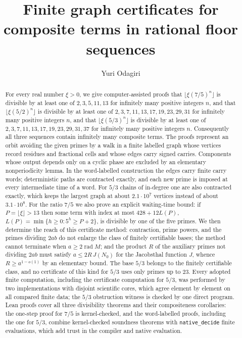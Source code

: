 \documentclass[11pt,reqno]{amsart}
\title[Finite graph certificates]{Finite graph certificates for composite terms in rational floor sequences}
\author{Yuri Odagiri}
\date{}
\theoremstyle{definition}
\theoremstyle{remark}
\begin{document}

\begin{abstract}

For every real number \(\xi>0\), we give computer-assisted proofs that
\(\lfloor\xi(7/5)^n\rfloor\) is divisible by at least one of
\(2,3,5,11,13\) for infinitely many positive integers \(n\), and that
\(\lfloor\xi(5/2)^n\rfloor\) is divisible by at least one of
\(2,3,7,11,13,17,19,23,29,31\) for infinitely many positive integers
\(n\), and that \(\lfloor\xi(5/3)^n\rfloor\) is divisible by at least one
of \(2,3,7,11,13,17,19,23,29,31,37\) for infinitely many positive integers
\(n\). Consequently all three sequences contain infinitely many composite
terms. The proofs represent an orbit avoiding the given primes by a walk in
a finite labelled graph whose vertices record residues and fractional
cells and whose edges carry signed carries. Components whose output
depends only on a cyclic phase are excluded by an elementary
nonperiodicity lemma. In the word-labelled construction the edges carry
finite carry words; deterministic paths are contracted exactly, and each
new prime is imposed at every intermediate time of a word. For
\(5/3\) chains of in-degree one are also contracted exactly, which keeps
the largest graph at about \(2.1\cdot10^7\) vertices instead of about
\(3.1\cdot10^8\). For the ratio
\(7/5\) we also prove an explicit waiting-time bound: if
\(P=\lfloor\xi\rfloor>13\) then some term with index at most
\(428+12L(P)\), \(L(P)=\min\{h\ge0:5^h\ge P+2\}\), is divisible by one
of the five primes. We then determine the reach of this certificate
method: contraction, prime powers, and the primes dividing \(2ab\) do not
enlarge the class of finitely certifiable bases; the method cannot
terminate when \(a\ge2\operatorname{rad}M\); and the product \(R\) of the
auxiliary primes not dividing \(2ab\) must satisfy
\(a\le2R\,J(N_0)\) for the Jacobsthal function \(J\), whence
\(R\ge a^{1-o(1)}\) by an elementary bound. The base \(5/3\) belongs to
the finitely certifiable class, and no certificate of this kind for
\(5/3\) uses only primes up to \(23\). Every adopted finite
computation, including the certificate computation for \(5/3\), was
performed by two implementations with disjoint scientific cores, which
agree element by element on all compared finite data; the \(5/3\)
obstruction witness is checked by one direct program.
Lean proofs cover all three divisibility theorems and their compositeness
corollaries: the one-step proof for \(7/5\) is kernel-checked, and the
word-labelled proofs, including the one for \(5/3\), combine kernel-checked
soundness theorems with \nolinkurl{native_decide} finite evaluations, which
add trust in the compiler and native evaluation.

\end{abstract}
\maketitle
\enlargethispage{4pt}
\end{document}
